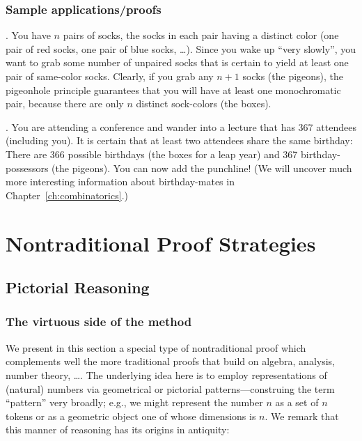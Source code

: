 \subsubsection{Sample applications/proofs}
\label{sec:pigeon-apps}

.
You have $n$ pairs of socks, the socks in each pair having a distinct color (one pair of red socks, one pair of blue socks, \ldots).  Since you wake up ``very slowly'', you want to grab some number of unpaired socks that is certain to yield at least one pair of same-color socks.  Clearly, if you grab any $n+1$ socks (the pigeons), the pigeonhole principle guarantees that you will have at least one monochromatic pair, because there are only $n$ distinct sock-colors (the boxes).

\medskip

.
You are attending a conference and wander into a lecture that has 367 attendees (including you).  It is certain that at least two attendees share the same birthday: There are 366 possible birthdays (the boxes for a leap year) and 367 birthday-possessors (the pigeons).  You can now add the punchline!  (We will uncover much more interesting information about birthday-mates in Chapter~\ref{ch:combinatorics}.)




\section{Nontraditional Proof Strategies}
\label{sec:nontraditionalProofs}

\subsection{Pictorial Reasoning}
\label{sec:graphicalproofs}

\subsubsection{The virtuous side of the method}

We present in this section a special type of nontraditional proof which complements well the more traditional proofs that build on algebra, analysis, number theory, \ldots.  The underlying idea here is to employ representations of (natural) numbers via geometrical or pictorial
patterns---construing the term ``pattern'' very broadly; e.g., we might represent the number $n$ as a set of $n$ tokens or as a geometric object one of whose dimensions is $n$.  We remark that this manner of reasoning has its origins in antiquity:

